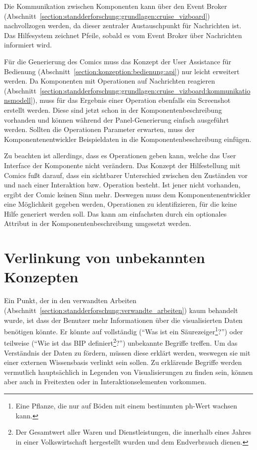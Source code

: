 \documentclass[
	headsepline,
	footsepline,
	fontsize=12pt,
	bibliography=totoc
]{scrbook}
\begin{document}
Die Kommunikation zwischen Komponenten kann über den Event Broker (Abschnitt~\ref{section:standderforschung:grundlagen:cruise_vizboard}) nachvollzogen werden, da dieser zentraler Austauschpunkt für Nachrichten ist. Das Hilfesystem zeichnet Pfeile, sobald es vom Event Broker über Nachrichten informiert wird.

Für die Generierung des Comics muss das Konzept der User Assistance für Bedienung (Abschnitt~\ref{section:konzeption:bedienung:api}) nur leicht erweitert werden. Da Komponenten mit Operationen auf Nachrichten reagieren (Abschnitt~\ref{section:standderforschung:grundlagen:cruise_vizboard:kommunikationsmodell}), muss für das Ergebnis einer Operation ebenfalls ein Screenshot erstellt werden. Diese sind jetzt schon in der Komponentenbeschreibung vorhanden und können während der Panel-Generierung einfach ausgeführt werden. Sollten die Operationen Parameter erwarten, muss der Komponentenentwickler Beispieldaten in die Komponentenbeschreibung einfügen.

Zu beachten ist allerdings, dass es Operationen geben kann, welche das User Interface der Komponente nicht verändern. Das Konzept der Hilfestellung mit Comics fußt darauf, dass ein sichtbarer Unterschied zwischen den Zuständen vor und nach einer Interaktion bzw. Operation besteht. Ist jener nicht vorhanden, ergibt der Comic keinen Sinn mehr. Deswegen muss dem Komponentenentwickler eine Möglichkeit gegeben werden, Operationen zu identifizieren, für die keine Hilfe generiert werden soll. Das kann am einfachsten durch ein optionales Attribut in der Komponentenbeschreibung umgesetzt werden.

\section{Verlinkung von unbekannten Konzepten}
\label{section:konzeption:verlinkung}


Ein Punkt, der in den verwandten Arbeiten (Abschnitt~\ref{section:standderforschung:verwandte_arbeiten}) kaum behandelt wurde, ist dass der Benutzer mehr Informationen über die visualisierten Daten benötigen könnte. Er könnte auf vollständig (\enquote{Was ist ein Säurezeiger\footnote{Eine Pflanze, die nur auf Böden mit einem bestimmten ph-Wert wachsen kann.}?}) oder teilweise (\enquote{Wie ist das BIP definiert\footnote{Der Gesamtwert aller Waren und Dienstleistungen, die innerhalb eines Jahres in einer Volkswirtschaft hergestellt wurden und dem Endverbrauch dienen.}?}) unbekannte Begriffe treffen. Um das Verständnis der Daten zu fördern, müssen diese erklärt werden, weswegen sie mit einer externen Wissensbasis verlinkt sein sollen. Zu erklärende Begriffe werden vermutlich hauptsächlich in Legenden von Visualisierungen zu finden sein, können aber auch in Freitexten oder in Interaktionselementen vorkommen.
\end{document}
